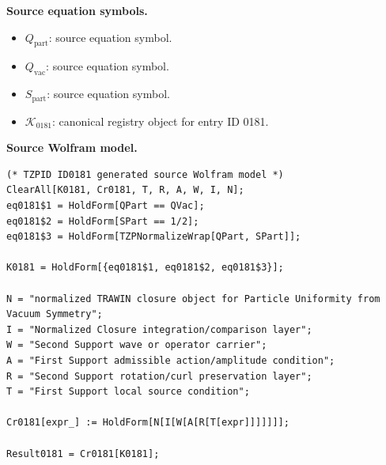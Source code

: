 \begin{minipage}[t]{0.49\linewidth}
\begingroup
\small
\raggedright
\textbf{Source equation symbols.}\par
\begin{itemize}[leftmargin=1.35em,itemsep=1pt,topsep=1pt,parsep=0pt]
    \item $Q_{\mathrm{part}}$: source equation symbol.
    \item $Q_{\mathrm{vac}}$: source equation symbol.
    \item $S_{\mathrm{part}}$: source equation symbol.
    \item $\mathcal{K}_{0181}$: canonical registry object for entry ID 0181.
\end{itemize}
\endgroup
\end{minipage}\hfill
\begin{minipage}[t]{0.47\linewidth}
\begingroup
\scriptsize
\raggedright
\textbf{Source Wolfram model.}\par
\begin{Verbatim}[fontsize=\tiny,breaklines=true,breakanywhere=true]
(* TZPID ID0181 generated source Wolfram model *)
ClearAll[K0181, Cr0181, T, R, A, W, I, N];
eq0181$1 = HoldForm[QPart == QVac];
eq0181$2 = HoldForm[SPart == 1/2];
eq0181$3 = HoldForm[TZPNormalizeWrap[QPart, SPart]];

K0181 = HoldForm[{eq0181$1, eq0181$2, eq0181$3}];

N = "normalized TRAWIN closure object for Particle Uniformity from Vacuum Symmetry";
I = "Normalized Closure integration/comparison layer";
W = "Second Support wave or operator carrier";
A = "First Support admissible action/amplitude condition";
R = "Second Support rotation/curl preservation layer";
T = "First Support local source condition";

Cr0181[expr_] := HoldForm[N[I[W[A[R[T[expr]]]]]]];

Result0181 = Cr0181[K0181];
\end{Verbatim}
\endgroup
\end{minipage}

